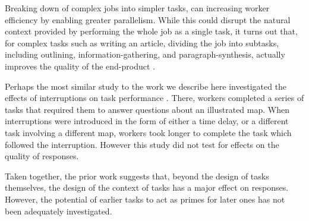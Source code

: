 \documentclass{sigchi}
\begin{document}
Breaking down of complex jobs into simpler tasks, can increasing worker
efficiency by enabling greater parallelism.
While this could disrupt the natural context provided by performing the
whole job as a single task, it turns out that, 
for complex tasks such as writing an article, 
dividing the job into subtasks, including outlining, 
information-gathering, and paragraph-synthesis, actually improves the
quality of the end-product \cite{kittur2011crowdforge}.

Perhaps the most similar study to the work we describe here 
investigated the effects of interruptions on task performance
\cite{laseckieffects}.  There, workers 
completed a series of tasks that required them to answer questions about
an illustrated map.  When interruptions were introduced
in the form of either a time delay, or a different task involving a
different map, workers took longer to complete the task which 
followed the interruption.  However this study did not test for
effects on the quality of responses.

Taken together, the prior work suggests that, beyond the design
of tasks themselves, the design of the context of tasks has a major
effect on responses.
However, the potential of earlier tasks to act as primes for later ones 
has not been adequately investigated.
\end{document}
